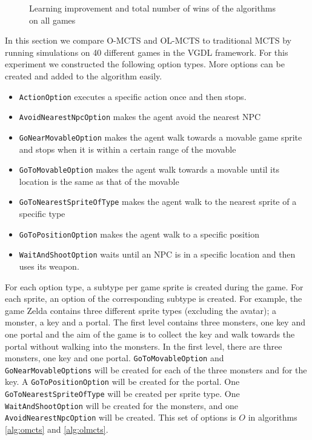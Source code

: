 \begin{figure}
{		\label{fig:learning-results}
	}
	\caption{Learning improvement and total number of wins of the algorithms on
	all games}
\end{figure}

In this section we compare O-MCTS and OL-MCTS to traditional MCTS by running
simulations on 40 different games in the VGDL framework. For this experiment
we constructed the following option types. More options can be created and added
to the algorithm easily.

\begin{itemize}[noitemsep]
	\item \texttt{ActionOption} executes a specific action once and then
		stops.
	\item \texttt{AvoidNearestNpcOption} makes the agent avoid the nearest NPC
	\item \texttt{GoNearMovableOption} makes the agent walk towards a
		movable game sprite and stops when it is within a certain range of the
		movable
	\item \texttt{GoToMovableOption} makes the agent walk towards a
		movable until its location is the same as that of the movable
	\item \texttt{GoToNearestSpriteOfType} makes the agent walk to the nearest sprite of
		a specific type
	\item \texttt{GoToPositionOption} makes the agent walk to a specific position
	\item \texttt{WaitAndShootOption} waits until an NPC is in a specific location and
		then uses its weapon.
\end{itemize}

For each option type, a subtype per game sprite is created during the game. For
each sprite, an option of the corresponding subtype is created. For example, the
game Zelda contains three different sprite types (excluding the avatar); a
monster, a key and a portal. The first level contains three monsters, one key
and one portal and the aim of the game is to collect the key and walk towards
the portal without walking into the monsters. In the first level, there are
three monsters, one key and one portal. \texttt{GoToMovableOption} and
\texttt{GoNearMovableOptions} will be created for each of the three monsters and
for the key. A \texttt{GoToPositionOption} will be created for the portal.
One \texttt{GoToNearestSpriteOfType} will be created per sprite type. One
\texttt{WaitAndShootOption} will be created for the monsters, and one
\texttt{AvoidNearestNpcOption} will be
created. This set of options is $O$ in algorithms \ref{alg:omcts} and
\ref{alg:olmcts}.

